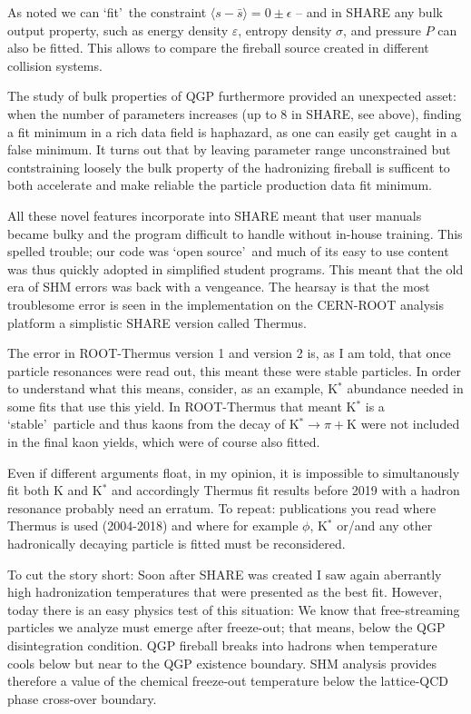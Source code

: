 As noted we can \lq fit\rq\ the constraint $\langle s-\bar s\rangle =0\pm \epsilon$ -- and in SHARE any bulk output property, such as energy density $\varepsilon$, entropy density $\sigma$, and pressure $P$ can also be fitted. This allows to compare the fireball source created in different collision systems.

The study of bulk properties of QGP furthermore provided an unexpected asset: when the number of parameters increases (up to 8 in SHARE, see above), finding a fit minimum in a rich data field is haphazard, as one can easily get caught in a false minimum. It turns out that by leaving parameter range unconstrained but contstraining loosely the bulk property of the hadronizing fireball is sufficent to both accelerate and make reliable the particle production data fit minimum. 

All these novel features incorporate into SHARE meant that user manuals~\cite{Torrieri:2004zz,Torrieri:2006xi,Petran:2013dva} became bulky and the program difficult to handle without in-house training. This spelled trouble; our code was \lq open source\rq\ and much of its easy to use content was thus quickly adopted in simplified student programs. This meant that the old era of SHM errors was back with a vengeance. The hearsay is that the most troublesome error is seen in the implementation on the CERN-ROOT analysis platform a simplistic SHARE version called Thermus.

The error in ROOT-Thermus version 1 and version 2 is, as I am told, that once particle resonances were read out, this meant these were stable particles. In order to understand what this means, consider, as an example, K$^*$ abundance needed in some fits that use this yield. In ROOT-Thermus that meant K$^*$ is a \lq stable\rq\ particle and thus kaons from the decay of K$^*\to \pi+$K were not included in the final kaon yields, which were of course also fitted. 

Even if different arguments float, in my opinion, it is impossible to simultanously fit both K and K$^*$ and accordingly Thermus fit results before 2019  with a hadron resonance probably need an erratum. To repeat: publications you read where Thermus is used (2004-2018) and where for example $\phi$, K$^*$ or/and any other hadronically decaying particle is fitted must be reconsidered.

To cut the story short: Soon after SHARE was created I saw again aberrantly high hadronization temperatures that were presented as the best fit. However, today there is an easy physics test of this situation: We know that free-streaming particles we analyze must emerge after freeze-out; that means, below the QGP disintegration condition. QGP fireball breaks into hadrons when temperature cools below but near to the QGP existence boundary. SHM analysis provides therefore a value of the chemical freeze-out temperature below the lattice-QCD phase cross-over boundary.


